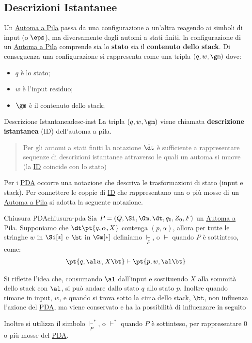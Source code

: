\subsection{Descrizioni Istantanee}\label{sub:ll_descrizioni_istantanee} %
Un \hyperref[def:pda]{Automa a Pila} passa da una configurazione a un'altra reagendo ai simboli di input (o $\eps$), ma diversamente dagli automi a stati finiti, la configurazione di un \hyperref[def:pda]{Automa a Pila} comprende sia lo \textbf{stato} sia il \textbf{contenuto dello stack}.
\emptyln{}
Di conseguenza una configurazione si rappresenta come una tripla $(q,w,\gm)$ dove:
\begin{itemize}
    \item $q$ è lo stato;
    \item $w$ è l'input residuo;
    \item $\gm$ è il contenuto dello stack;
\end{itemize}
\begin{definition}{Descrizione Istantanea}{desc-inst}
    La tripla $(q,w,\gm)$ viene chiamata \textbf{descrizione istantanea} (ID) dell'automa a pila.
\end{definition}
\begin{quote}
    Per gli automi a stati finiti la notazione $\hat\dt$ è sufficiente a rappresentare sequenze di descrizioni istantanee attraverso le quali un automa si muove (la \hyperref[def:desc-inst]{ID} coincide con lo stato)
\end{quote}
Per i \hyperref[def:pda]{PDA} occorre una notazione che descriva le trasformazioni di stato (input e stack).
Per connettere le coppie di \hyperref[def:desc-inst]{ID} che rappresentano una o più mosse di un \hyperref[def:pda]{Automa a Pila} si adotta la seguente notazione.
\begin{definition}{Chiusura PDA}{chiusura-pda}
    Sia $P = (Q,\Si, \Gm, \dt, q_0, Z_0,F)$ un \hyperref[def:pda]{Automa a Pila}.
    Supponiamo che $\dt\pt{q,\alpha,X}$ contenga $(p,\alpha)$, allora per tutte le stringhe $w$ in $\Si[*]$ e $\bt$ in $\Gm[*]$ definiamo $\underset{P}{\vdash}$, o $\vdash$ quando $P$ è sottinteso, come:
    \[
        \pt{q,\al w,X\bt} \vdash \pt{p,w,\al\bt}
    \]
    \begin{note}
        Si riflette l'idea che, consumando $\al$ dall'input e sostituendo $X$ alla sommità dello stack con $\al$, si può andare dallo stato $q$ allo stato $p$.
        \emptyln{}
        Inoltre quando rimane in input, $w$, e quando si trova sotto la cima dello stack, $\bt$, non influenza l'azione del \hyperref[def:pda]{PDA}, ma viene conservato e ha la possibilità di influenzare in seguito
    \end{note}
    Inoltre si utilizza il simbolo $\underset{P}{\vdash}^*$, o $\vdash^*$ quando $P$ è sottinteso, per rappresentare $0$ o più mosse del \hyperref[def:pda]{PDA}.
\end{definition}
